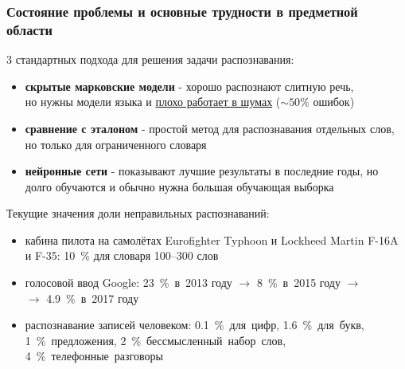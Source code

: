 \begin{frame}
\frametitle{\small Состояние проблемы и основные трудности в предметной области}
\footnotesize
\vfill
3 стандартных подхода для решения задачи распознавания:
\vfill
\begin{itemize}
	\item \textbf{скрытые марковские модели} - хорошо распознают слитную речь,\\ но нужны модели языка и \underline{плохо работает в шумах} ($\sim 50\%$ ошибок)
	\item \textbf{сравнение с эталоном} - простой метод для распознавания отдельных слов, но только для ограниченного словаря
	\item \textbf{нейронные сети} - показывают лучшие результаты в последние годы, но долго обучаются и обычно нужна большая обучающая выборка
\end{itemize}
\vfill
Текущие значения доли неправильных распознаваний:
\vfill
\begin{itemize} 
	\item кабина пилота на самолётах Eurofighter Typhoon и Lockheed Martin F-16A и F-35: 10~\% для словаря 100--300 слов
	\item голосовой ввод Google: 23~\%~в~2013 году $\rightarrow$ 8~\%~в~2015 году $\rightarrow$\\$\rightarrow$ 4.9~\%~в~2017 году
	\item распознавание записей человеком: 0.1~\%~для~цифр, 1.6~\%~для~букв, 1~\%~предложения, 2~\%~бессмысленный~набор~слов, 4~\%~телефонные~разговоры
\end{itemize}
\vfill
\end{frame}

